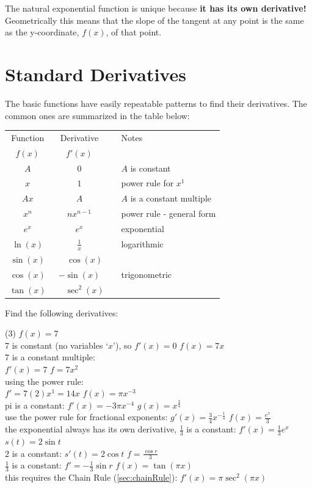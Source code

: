 The natural exponential function is unique because \textbf{it has its own derivative!} Geometrically this means that the slope of the tangent at any point is the same as the y-coordinate, $f(x)$, of that point. 

\section{Standard Derivatives}
The basic functions have easily repeatable patterns to find their derivatives. The common ones are summarized in the table below:
\begin{center}
	\begin{tabular}{ccll}	
		\toprule
		Function& Derivative&&Notes\\
		$f(x)$ & $f'(x)$  &&\\ \midrule
		$A$&0&&$A$ is constant\\ \midrule
		$x$&$1$&&power rule for $x^1$\\ \midrule
		$Ax$&$A$&&$A$ is a constant multiple\\ \midrule
		$x^n$ & $nx^{n-1}$ &&power rule - general form\\ \midrule
		$e^x$ & $e^x$  && exponential\\ \midrule
		$\ln(x)$ & $\frac{1}{x}$ &&logarithmic\\ \midrule
		$\sin(x)$ & $\phantom{-}\cos(x)$  && \\ \cmidrule{1-2}
		$\cos(x)$ & $-\sin(x)$ && trigonometric\\ \cmidrule{1-2}
		$\tan(x)$ & $\phantom{-}\sec^2(x)$ && \\ \bottomrule
	\end{tabular}
\end{center}\clearpage
\example Find the following derivatives:
\begin{tasks}[column-sep=2em,after-item-skip=3ex](3)
	\task $f(x)=7$\\ 7 is constant (no variables `$x$'), so $f'(x)=0$
	\task $f(x)=7x$\\ 7 is a constant multiple: \\ $f'(x)=7$
	\task $f=7x^2$\\ using the power rule:\\ $f'=7(2)x^1=14x$ 
	\task $f(x)=\pi x^{-3}$\\pi is a constant: $f'(x)=-3\pi x^{-4}$
	\task $\displaystyle g(x)=x^{\frac{3}{4}}$\\ use the power rule for fractional exponents: $\displaystyle g'(x)=\frac{3}{4}x^{-\frac{1}{4}}$
	\task $f(x)=\displaystyle\frac{e^x}{3}$\\ the exponential always has its own derivative, $\frac{1}{3}$ is a constant: $f'(x)=\frac{1}{3}e^x$ 	
	\task $s(t)=2\sin t$\\ 2 is a constant: $s'(t)=2\cos t$
	\task $f=\displaystyle\frac{\cos r}{3}$\\ $\frac{1}{3}$ is a constant: $f'=-\frac{1}{3}\sin r$
	\task $f(x)=\tan (\pi x)$\\ this requires the Chain Rule (\ref{sec:chainRule}): $f'(x)=\pi\sec^2 (\pi x)$
\end{tasks}

